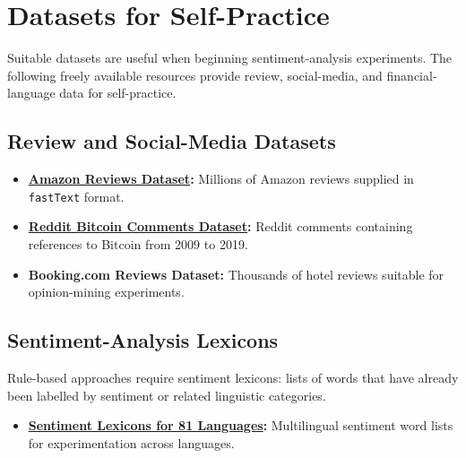 \documentclass[12pt,openany]{book}
\theoremstyle{definition}
\theoremstyle{remark}
\begin{document}
\chapter{Datasets for Self-Practice}

Suitable datasets are useful when beginning sentiment-analysis experiments.
The following freely available resources provide review, social-media, and
financial-language data for self-practice.

\section{Review and Social-Media Datasets}

\begin{itemize}





\item \textbf{\href{https://www.kaggle.com/datasets/bittlingmayer/amazonreviews}{Amazon Reviews Dataset}:}
Millions of Amazon reviews supplied in \texttt{fastText} format.



\item \textbf{\href{https://www.kaggle.com/datasets/jerryfanelli/reddit-comments-containing-bitcoin-2009-to-2019}{Reddit Bitcoin Comments Dataset}:}
Reddit comments containing references to Bitcoin from 2009 to 2019.



\item \textbf{Booking.com Reviews Dataset:}
Thousands of hotel reviews suitable for opinion-mining experiments.
\end{itemize}

\section{Sentiment-Analysis Lexicons}

Rule-based approaches require sentiment lexicons: lists of words that have
already been labelled by sentiment or related linguistic categories.





\begin{itemize}
\item \textbf{\href{https://www.kaggle.com/datasets/rtatman/sentiment-lexicons-for-81-languages}{Sentiment Lexicons for 81 Languages}:}
Multilingual sentiment word lists for experimentation across languages.
\end{itemize}
\end{document}
